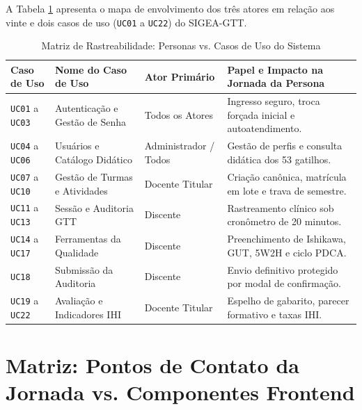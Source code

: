 A Tabela \ref{tab_rastreabilidade_personas_uc} apresenta o mapa de envolvimento dos três atores em relação aos vinte e dois casos de uso (\texttt{UC01} a \texttt{UC22}) do SIGEA-GTT.

\begin{table}[!ht]
\centering
\caption{Matriz de Rastreabilidade: Personas vs. Casos de Uso do Sistema}
\label{tab_rastreabilidade_personas_uc}
\footnotesize
\begin{tabularx}{\textwidth}{p{2.8cm} p{4.2cm} p{2.2cm} X}
\toprule
\textbf{Caso de Uso} & \textbf{Nome do Caso de Uso} & \textbf{Ator Primário} & \textbf{Papel e Impacto na Jornada da Persona} \\
\midrule
\texttt{UC01} a \texttt{UC03} & Autenticação e Gestão de Senha & Todos os Atores & Ingresso seguro, troca forçada inicial e autoatendimento. \\
\addlinespace
\texttt{UC04} a \texttt{UC06} & Usuários e Catálogo Didático & Administrador / Todos & Gestão de perfis e consulta didática dos 53 gatilhos. \\
\addlinespace
\texttt{UC07} a \texttt{UC10} & Gestão de Turmas e Atividades & Docente Titular & Criação canônica, matrícula em lote e trava de semestre. \\
\addlinespace
\texttt{UC11} a \texttt{UC13} & Sessão e Auditoria GTT & Discente & Rastreamento clínico sob cronômetro de 20 minutos. \\
\addlinespace
\texttt{UC14} a \texttt{UC17} & Ferramentas da Qualidade & Discente & Preenchimento de Ishikawa, GUT, 5W2H e ciclo PDCA. \\
\addlinespace
\texttt{UC18} & Submissão da Auditoria & Discente & Envio definitivo protegido por modal de confirmação. \\
\addlinespace
\texttt{UC19} a \texttt{UC22} & Avaliação e Indicadores IHI & Docente Titular & Espelho de gabarito, parecer formativo e taxas IHI. \\
\bottomrule
\end{tabularx}
\end{table}

\section{Matriz: Pontos de Contato da Jornada vs. Componentes Frontend}
\label{sec_matriz_touchpoints_componentes}

